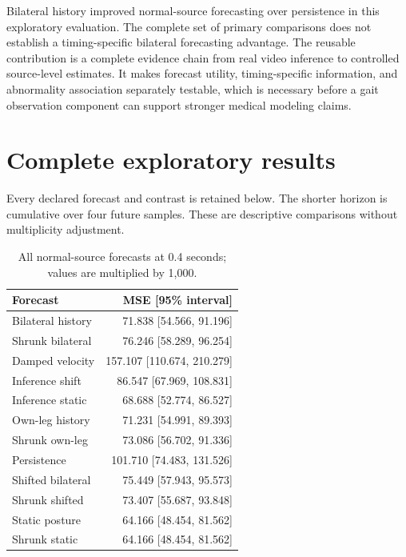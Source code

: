 \documentclass[letterpaper]{article}
\begin{document}
Bilateral history improved normal-source forecasting over persistence in this exploratory evaluation. The complete set of primary comparisons does not establish a timing-specific bilateral forecasting advantage. The reusable contribution is a complete evidence chain from real video inference to controlled source-level estimates. It makes forecast utility, timing-specific information, and abnormality association separately testable, which is necessary before a gait observation component can support stronger medical modeling claims.

\clearpage





\clearpage

\appendix

\section{Complete exploratory results}

Every declared forecast and contrast is retained below. The shorter horizon is cumulative over four future samples. These are descriptive comparisons without multiplicity adjustment.

\begin{table}[t]
\centering
\small
\begin{tabular}{lr}
\toprule
Forecast & MSE [95\% interval] \\
\midrule
Bilateral history & 71.838 [54.566, 91.196] \\
Shrunk bilateral & 76.246 [58.289, 96.254] \\
Damped velocity & 157.107 [110.674, 210.279] \\
Inference shift & 86.547 [67.969, 108.831] \\
Inference static & 68.688 [52.774, 86.527] \\
Own-leg history & 71.231 [54.991, 89.393] \\
Shrunk own-leg & 73.086 [56.702, 91.336] \\
Persistence & 101.710 [74.483, 131.526] \\
Shifted bilateral & 75.449 [57.943, 95.573] \\
Shrunk shifted & 73.407 [55.687, 93.848] \\
Static posture & 64.166 [48.454, 81.562] \\
Shrunk static & 64.166 [48.454, 81.562] \\
\bottomrule
\end{tabular}
\caption{All normal-source forecasts at 0.4 seconds; values are multiplied by 1,000.}
\end{table}
\end{document}

